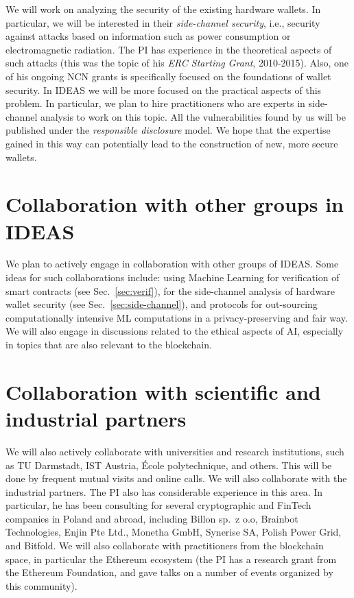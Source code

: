 \documentclass{article}
\begin{document}
We will work on analyzing the security of the existing hardware wallets. In particular, we will be interested in their \emph{side-channel security}, i.e., security against attacks based on information such as power consumption or electromagnetic radiation. The PI has experience in the theoretical aspects of such attacks (this was the topic of his \emph{ERC Starting Grant}, 2010-2015). Also, one of his ongoing NCN grants is specifically focused on the foundations of wallet security. In IDEAS we will be more focused on the practical aspects of this problem. In particular, we plan to hire practitioners who are experts in side-channel analysis to work on this topic. All the vulnerabilities found by us will be published under the \emph{responsible disclosure} model. We hope that the expertise gained in this way can potentially lead to the construction of new, more secure wallets. 

\section{Collaboration with other groups in IDEAS}

We plan to actively engage in collaboration with other groups of IDEAS. Some ideas for such collaborations include: using Machine Learning for verification of smart contracts (see Sec.~\ref{sec:verif}), for the side-channel analysis of hardware wallet security (see Sec.~\ref{sec:side-channel}), and protocols for out-sourcing computationally intensive ML computations in a privacy-preserving and fair way. We will also engage in discussions related to the ethical aspects of AI, especially in topics that are also relevant to the blockchain.



\section{Collaboration with scientific and industrial partners}

We will also actively collaborate with universities and research institutions, such as TU Darmstadt, IST Austria, \'Ecole polytechnique, and others. This will be done by frequent mutual visits and online calls. We will also collaborate with the industrial partners. The PI also has considerable experience in this area. In particular, he has been consulting for several cryptographic and FinTech companies in Poland and abroad, including  Billon sp.~z o.o, Brainbot Technologies, Enjin Pte Ltd., Monetha GmbH, Synerise SA, Polish Power Grid, and  Bitfold. We will also collaborate with practitioners from the blockchain space, in particular the Ethereum ecosystem (the PI has a research grant from the Ethereum Foundation, and gave talks on a number of events organized by this community). 
\end{document}
